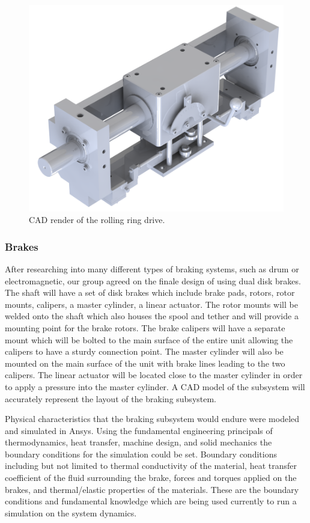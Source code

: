\begin{figure}[H]
  \centering
  \includegraphics[width=.7\textwidth]{Figures/RollingRingDrive.png}
  \caption{\label{fig:RollingRingDrive}CAD render of the rolling ring drive.}
\end{figure}

\subsubsection{Brakes}

\indent\indent After researching into many different types of braking systems, such as drum or electromagnetic, our group agreed on the finale design of using dual disk brakes. The shaft will have a set of disk brakes which include brake pads, rotors, rotor mounts, calipers, a master cylinder, a linear actuator. The rotor mounts will be welded onto the shaft which also houses the spool and tether and will provide a mounting point for the brake rotors. The brake calipers will have a separate mount which will be bolted to the main surface of the entire unit allowing the calipers to have a sturdy connection point. The master cylinder will also be mounted on the main surface of the unit with brake lines leading to the two calipers. The linear actuator will be located close to the master cylinder in order to apply a pressure into the master cylinder. A CAD model of the subsystem will accurately represent the layout of the braking subsystem.

Physical characteristics that the braking subsystem would endure were modeled and simulated in Ansys.  Using the fundamental engineering principals of thermodynamics, heat transfer, machine design, and solid mechanics the boundary conditions for the simulation could be set. Boundary conditions including but not limited to thermal conductivity of the material, heat transfer coefficient of the fluid surrounding the brake, forces and torques applied on the brakes, and thermal/elastic properties of the materials. These are the boundary conditions and fundamental knowledge which are being used currently to run a simulation on the system dynamics. 

